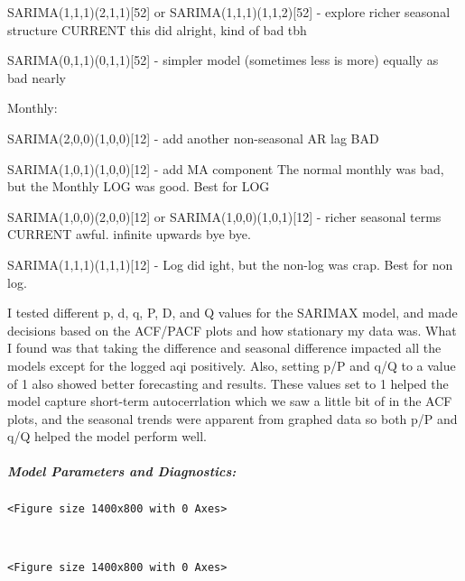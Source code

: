 \documentclass[11pt, twocolumn]{article}
\begin{document}
SARIMA(1,1,1)(2,1,1){[}52{]} or SARIMA(1,1,1)(1,1,2){[}52{]} - explore
richer seasonal structure CURRENT \textbar\textbar{} this did alright,
kind of bad tbh

SARIMA(0,1,1)(0,1,1){[}52{]} - simpler model (sometimes less is more)
\textbar{} equally as bad nearly

Monthly:

SARIMA(2,0,0)(1,0,0){[}12{]} - add another non-seasonal AR lag
\textbar{} BAD

SARIMA(1,0,1)(1,0,0){[}12{]} - add MA component \textbar{}
\textbar\textbar{} The normal monthly was bad, but the Monthly LOG was
good. Best for LOG

SARIMA(1,0,0)(2,0,0){[}12{]} or SARIMA(1,0,0)(1,0,1){[}12{]} - richer
seasonal terms \textbar{} CURRENT \textbar\textbar{} awful. infinite
upwards bye bye.

SARIMA(1,1,1)(1,1,1){[}12{]} - Log did ight, but the non-log was crap.
Best for non log.

    I tested different p, d, q, P, D, and Q values for the SARIMAX model,
and made decisions based on the ACF/PACF plots and how stationary my
data was. What I found was that taking the difference and seasonal
difference impacted all the models except for the logged aqi positively.
Also, setting p/P and q/Q to a value of 1 also showed better forecasting
and results. These values set to 1 helped the model capture short-term
autocerrlation which we saw a little bit of in the ACF plots, and the
seasonal trends were apparent from graphed data so both p/P and q/Q
helped the model perform well.

    \subparagraph{Model Parameters and
Diagnostics:}\label{model-parameters-and-diagnostics}

    
    \begin{Verbatim}[commandchars=\\\{\}]
<Figure size 1400x800 with 0 Axes>
    \end{Verbatim}

    
    \begin{center}
    \end{center}
    { \hspace*{\fill} \\}
    
    
    \begin{Verbatim}[commandchars=\\\{\}]
<Figure size 1400x800 with 0 Axes>
    \end{Verbatim}
\end{document}
